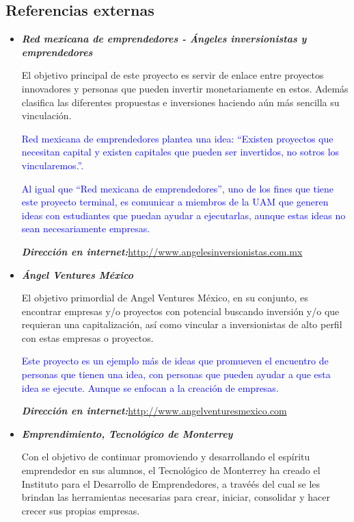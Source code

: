 \documentclass[11pt,letterpaper,titlepage]{article}
\begin{document}
\subsection{Referencias externas}
\begin{itemize}
\item \textit{\textbf{Red mexicana de emprendedores - \'Angeles inversionistas y emprendedores}}

El objetivo principal de este proyecto es servir de enlace entre proyectos innovadores y personas que pueden invertir monetariamente en estos. Adem\'as clasifica las diferentes propuestas e inversiones haciendo a\'un m\'as sencilla su vinculaci\'on.

\textcolor{blue}{Red mexicana de emprendedores plantea una idea: ``Existen proyectos que necesitan capital y existen capitales que pueden ser invertidos, no sotros los vincularemos.''. }

\textcolor{blue}{Al igual que ``Red mexicana de emprendedores'', uno de los fines que tiene este proyecto terminal, es comunicar a miembros de la UAM que generen ideas con estudiantes que puedan ayudar a ejecutarlas, aunque estas ideas no sean necesariamente empresas.}

\textit{\textbf{Direcci\'on en internet:}}\href{http://www.angelesinversionistas.com.mx}{http://www.angelesinversionistas.com.mx}

\item \textit{\textbf{\'Angel Ventures M\'exico }}

El objetivo primordial de Angel Ventures M\'exico, en su conjunto, es encontrar empresas y/o proyectos con potencial buscando inversi\'on y/o que requieran una capitalizaci\'on, as\'i como vincular a inversionistas de alto perfil con estas empresas o proyectos.

\textcolor{blue}{Este proyecto es un ejemplo m\'as de ideas que promueven el encuentro de personas que tienen una idea, con personas que pueden ayudar a que esta idea se ejecute. Aunque se enfocan a la creaci\'on de empresas.}

\textit{\textbf{Direcci\'on en internet:}}\href{http://www.angelventuresmexico.com}{http://www.angelventuresmexico.com}


\item \textit{\textbf{Emprendimiento, Tecnol\'ogico de Monterrey}}

Con el objetivo de continuar promoviendo y desarrollando el esp\'iritu emprendedor en sus alumnos, el Tecnol\'ogico de Monterrey ha creado el Instituto para el Desarrollo de Emprendedores, a travé\'es del cual se les brindan las herramientas necesarias para crear, iniciar, consolidar y hacer crecer sus propias empresas. 


\end{itemize}
\end{document}
